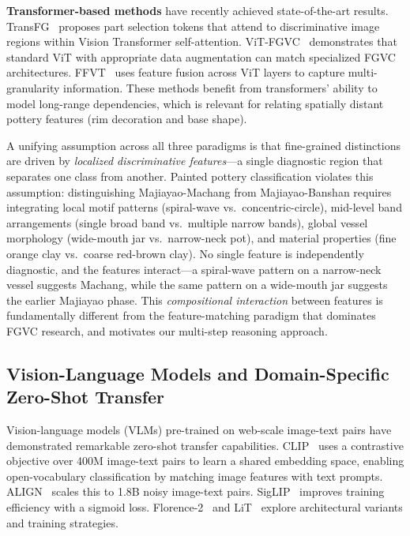 \documentclass[10pt,twocolumn,letterpaper]{article}
\begin{document}
\textbf{Transformer-based methods} have recently achieved state-of-the-art results. TransFG~\cite{he2021transfg} proposes part selection tokens that attend to discriminative image regions within Vision Transformer self-attention. ViT-FGVC~\cite{xu2022vit} demonstrates that standard ViT with appropriate data augmentation can match specialized FGVC architectures. FFVT~\cite{wang2022feature} uses feature fusion across ViT layers to capture multi-granularity information. These methods benefit from transformers' ability to model long-range dependencies, which is relevant for relating spatially distant pottery features (rim decoration and base shape).

A unifying assumption across all three paradigms is that fine-grained distinctions are driven by \emph{localized discriminative features}---a single diagnostic region that separates one class from another. Painted pottery classification violates this assumption: distinguishing Majiayao-Machang from Majiayao-Banshan requires integrating local motif patterns (spiral-wave vs.\ concentric-circle), mid-level band arrangements (single broad band vs.\ multiple narrow bands), global vessel morphology (wide-mouth jar vs.\ narrow-neck pot), and material properties (fine orange clay vs.\ coarse red-brown clay). No single feature is independently diagnostic, and the features interact---a spiral-wave pattern on a narrow-neck vessel suggests Machang, while the same pattern on a wide-mouth jar suggests the earlier Majiayao phase. This \emph{compositional interaction} between features is fundamentally different from the feature-matching paradigm that dominates FGVC research, and motivates our multi-step reasoning approach.

\subsection{Vision-Language Models and Domain-Specific Zero-Shot Transfer}

Vision-language models (VLMs) pre-trained on web-scale image-text pairs have demonstrated remarkable zero-shot transfer capabilities. CLIP~\cite{radford2021learning} uses a contrastive objective over 400M image-text pairs to learn a shared embedding space, enabling open-vocabulary classification by matching image features with text prompts. ALIGN~\cite{jia2021scaling} scales this to 1.8B noisy image-text pairs. SigLIP~\cite{zhai2023sigmoid} improves training efficiency with a sigmoid loss. Florence-2~\cite{xiao2023florence} and LiT~\cite{zhai2022lit} explore architectural variants and training strategies.
\end{document}
